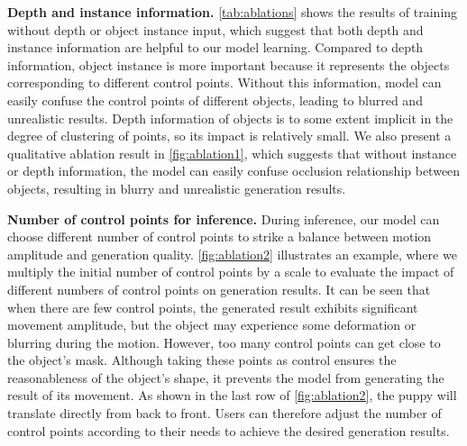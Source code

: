 \noindent \textbf{Depth and instance information.}
\cref{tab:ablations} shows the results of training \method without depth or object instance input, which suggest that both depth and instance information are helpful to our model learning. Compared to depth information, object instance is more important because it represents the objects corresponding to different control points. Without this information, model can easily confuse the control points of different objects, leading to blurred and unrealistic results. Depth information of objects is to some extent implicit in the degree of clustering of points, so its impact is relatively small. We also present a qualitative ablation result in \cref{fig:ablation1}, which suggests that without instance or depth information, the model can easily confuse occlusion relationship between objects, resulting in blurry and unrealistic generation results.






\noindent \textbf{Number of control points for inference.}
During inference, our model can choose different number of control points to strike a balance between motion amplitude and generation quality. \cref{fig:ablation2} illustrates an example, where we multiply the initial number of control points by a scale to evaluate the impact of different numbers of control points on generation results. It can be seen that when there are few control points, the generated result exhibits significant movement amplitude, but the object may experience some deformation or blurring during the motion. 
However, too many control points can get close to the object's mask. Although taking these points as control ensures the reasonableness of the object's shape, it prevents the model from generating the result of its movement. As shown in the last row of \cref{fig:ablation2}, the puppy will translate directly from back to front. Users can therefore adjust the number of control points according to their needs to achieve the desired generation results.
